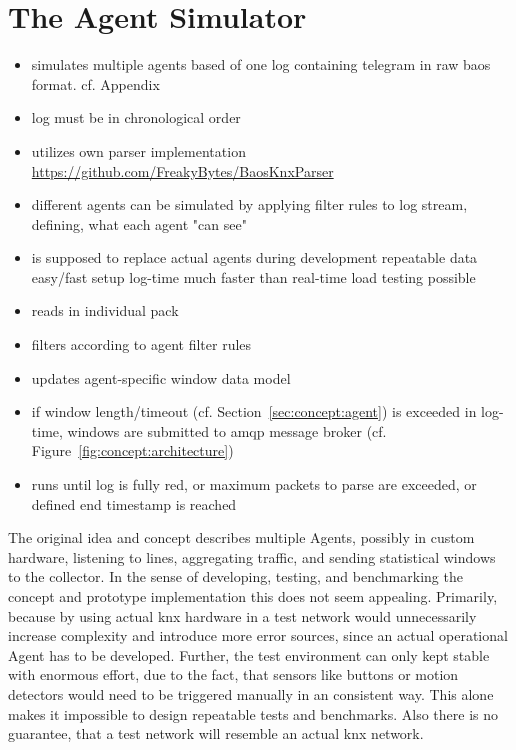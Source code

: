 \section{The Agent Simulator}
\label{sec:impl:agent}

\begin{itemize}
	\item simulates multiple agents based of one log containing telegram in raw \gls{baos} format. cf. Appendix~
	\item log must be in chronological order
	\item utilizes own parser implementation \url{https://github.com/FreakyBytes/BaosKnxParser}
	\item different agents can be simulated by applying filter rules to log stream, defining, what each agent "can see"
	\item is supposed to replace actual agents during development
	\subitem repeatable data
	\subitem easy/fast setup
	\subitem log-time much faster than real-time
	\subitem load testing possible
	\item reads in individual pack
	\item filters according to agent filter rules
	\item updates agent-specific window data model
	\item if window length/timeout (cf. Section~\ref{sec:concept:agent}) is exceeded in log-time, windows are submitted to \gls{amqp} message broker (cf. Figure~\ref{fig:concept:architecture})
	\item runs until log is fully red, or maximum packets to parse are exceeded, or defined end timestamp is reached
\end{itemize}

The original idea and concept describes multiple Agents, possibly in custom hardware, listening to lines, aggregating traffic, and sending statistical windows to the collector.
In the sense of developing, testing, and benchmarking the concept and prototype implementation this does not seem appealing. Primarily, because by using actual \gls{knx} hardware in a test network would unnecessarily increase complexity and introduce more error sources, since an actual operational Agent has to be developed.
Further, the test environment can only kept stable with enormous effort, due to the fact, that sensors like buttons or motion detectors would need to be triggered manually in an consistent way. This alone makes it impossible to design repeatable tests and benchmarks.
Also there is no guarantee, that a test network will resemble an actual \gls{knx} network.

